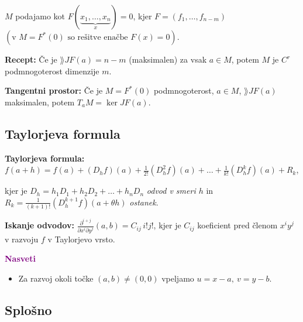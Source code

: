 $M$ podajamo kot $F(\underbrace{x_1, \ldots, x_{n}}_x) = 0 $, kjer $F = (f_1, \ldots, f_{n-m})$ $(\text{v } M = F^*(0) \text{ so rešitve enačbe } F(x) = 0)$.

\textbf{Recept:} Če je $\rang JF(a) = n-m$ (maksimalen) za vsak $a \in M$, potem $M$ je $C^r$ podmnogoterost dimenzije $m$.

\textbf{Tangentni prostor:}
Če je $M = F^*(0)$ podmnogoterost, $a \in M$, $\rang JF(a)$ maksimalen, potem $T_aM = \ker JF(a)$.

\subsection*{Taylorjeva formula}
\textbf{Taylorjeva formula:} $\displaystyle f(a+h) = f(a) + (D_hf)(a) + \frac{1}{2!}(D_h^2f)(a) + \ldots + \frac{1}{k!} (D_h^kf)(a) + R_k$,

kjer je $D_h = h_1D_1 + h_2D_2 + \ldots + h_nD_n$ \emph{odvod v smeri $h$} in $R_k = \frac{1}{(k+1)!} (D_h^{k+1}f)(a + \theta h)$ \emph{ostanek}.

\textbf{Iskanje odvodov:}
$\displaystyle \frac{\partial^{i+j}}{\partial x^i \partial y^j}(a, b) = C_{ij}\, i !j!$, kjer je $C_{ij}$ koeficient pred členom $x^iy^j$ v razvoju $f$ v Taylorjevo vrsto.

\textbf{\textcolor{purple}{Nasveti}}
\begin{itemize}
    \item Za razvoj okoli točke $(a,b) \neq (0,0)$ vpeljamo $u = x-a, \ v = y - b$.
\end{itemize}

\newpage
\subsection*{Splošno}
